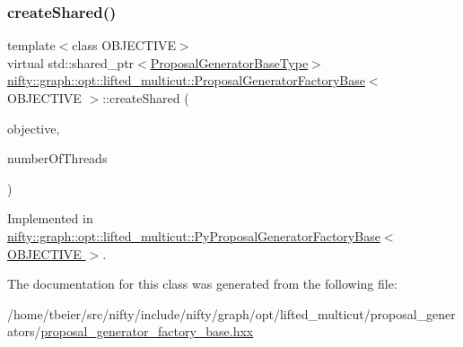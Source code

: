 \subsubsection{\texorpdfstring{create\+Shared()}{createShared()}}
{\footnotesize\ttfamily template$<$class O\+B\+J\+E\+C\+T\+I\+VE$>$ \\
virtual std\+::shared\+\_\+ptr$<$\hyperlink{classnifty_1_1graph_1_1opt_1_1lifted__multicut_1_1ProposalGeneratorFactoryBase_ab201fe6397370621b50977e67ae55ace}{Proposal\+Generator\+Base\+Type}$>$ \hyperlink{classnifty_1_1graph_1_1opt_1_1lifted__multicut_1_1ProposalGeneratorFactoryBase}{nifty\+::graph\+::opt\+::lifted\+\_\+multicut\+::\+Proposal\+Generator\+Factory\+Base}$<$ O\+B\+J\+E\+C\+T\+I\+VE $>$\+::create\+Shared (\begin{DoxyParamCaption}\item[{const \hyperlink{classnifty_1_1graph_1_1opt_1_1lifted__multicut_1_1ProposalGeneratorFactoryBase_a1986f0a3868e76ba5613f49ca4fc7dc6}{Objective\+Type} \&}]{objective,  }\item[{const size\+\_\+t}]{number\+Of\+Threads }\end{DoxyParamCaption})\hspace{0.3cm}{\ttfamily [pure virtual]}}



Implemented in \hyperlink{classnifty_1_1graph_1_1opt_1_1lifted__multicut_1_1PyProposalGeneratorFactoryBase_a1a74cc625dc38c80bf2bf64593a13346}{nifty\+::graph\+::opt\+::lifted\+\_\+multicut\+::\+Py\+Proposal\+Generator\+Factory\+Base$<$ O\+B\+J\+E\+C\+T\+I\+V\+E $>$}.



The documentation for this class was generated from the following file\+:\begin{DoxyCompactItemize}
\item 
/home/tbeier/src/nifty/include/nifty/graph/opt/lifted\+\_\+multicut/proposal\+\_\+generators/\hyperlink{lifted__multicut_2proposal__generators_2proposal__generator__factory__base_8hxx}{proposal\+\_\+generator\+\_\+factory\+\_\+base.\+hxx}\end{DoxyCompactItemize}
